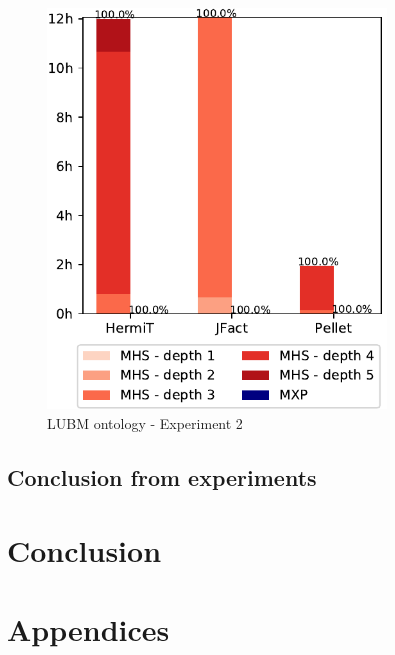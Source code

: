 \documentclass[12pt,a4paper]{article}
\begin{document}
\begin{figure}[H]
	\centering
	\includegraphics[width=9cm]{eval2LUBM} 
	\caption{LUBM ontology - Experiment 2}
	\label{fig:eval2LUBM}
\end{figure}

\subsection{Conclusion from experiments}


\pagebreak
\section*{Conclusion}

\pagebreak
{}



\pagebreak
\section*{Appendices}
\end{document}
